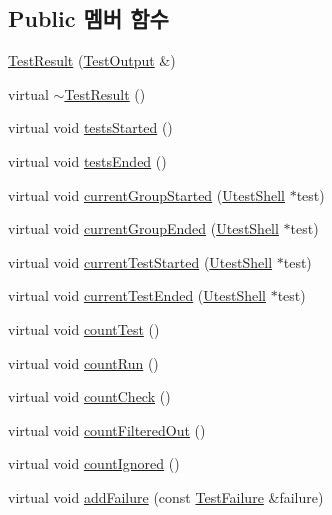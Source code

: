 \subsection*{Public 멤버 함수}
\begin{DoxyCompactItemize}
\item 
\hyperlink{class_test_result_a86c1b9c9203fdb9d2b1a3d85a0780fbf}{Test\+Result} (\hyperlink{class_test_output}{Test\+Output} \&)
\item 
virtual \hyperlink{class_test_result_ae2816ad307720d4dbdc73941639da1de}{$\sim$\+Test\+Result} ()
\item 
virtual void \hyperlink{class_test_result_aeb31f6af6445d908cb9dd8c91fd2ddf1}{tests\+Started} ()
\item 
virtual void \hyperlink{class_test_result_a47626fc9f8f52cc2b188a9f94a72f598}{tests\+Ended} ()
\item 
virtual void \hyperlink{class_test_result_a97d22b8a6b437f264c4913eb7c4ec540}{current\+Group\+Started} (\hyperlink{class_utest_shell}{Utest\+Shell} $\ast$test)
\item 
virtual void \hyperlink{class_test_result_a9373b80002f576f0328c80f3c7571c8a}{current\+Group\+Ended} (\hyperlink{class_utest_shell}{Utest\+Shell} $\ast$test)
\item 
virtual void \hyperlink{class_test_result_a83eaf7a8fb7f2f528bca8afe5abf55c4}{current\+Test\+Started} (\hyperlink{class_utest_shell}{Utest\+Shell} $\ast$test)
\item 
virtual void \hyperlink{class_test_result_ab6c4a307a4b8703215c519e1110d92c9}{current\+Test\+Ended} (\hyperlink{class_utest_shell}{Utest\+Shell} $\ast$test)
\item 
virtual void \hyperlink{class_test_result_a3ab54ad0444bf424ff50427e9f20a01c}{count\+Test} ()
\item 
virtual void \hyperlink{class_test_result_a988155e11cb6bc87d669b82832848511}{count\+Run} ()
\item 
virtual void \hyperlink{class_test_result_a58577489a2418efb4c440761e533f2e7}{count\+Check} ()
\item 
virtual void \hyperlink{class_test_result_ab01f644356c7b7487b7fc28cadfa8112}{count\+Filtered\+Out} ()
\item 
virtual void \hyperlink{class_test_result_ae64fc1e8e61088f7ebb45d4ddb9ebe8e}{count\+Ignored} ()
\item 
virtual void \hyperlink{class_test_result_a72cba7b88c906f8f5af977d360bd8c23}{add\+Failure} (const \hyperlink{class_test_failure}{Test\+Failure} \&failure)
\item 

\end{DoxyCompactItemize}
